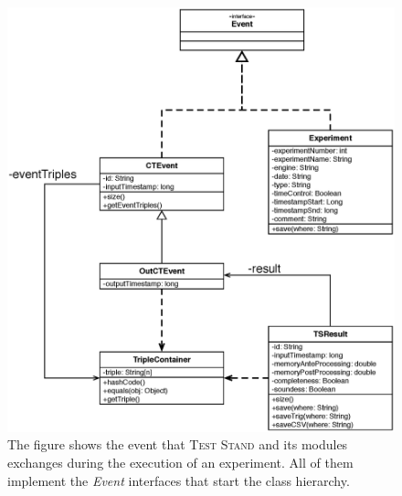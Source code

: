 \begin{figure}[tbh]
  \centering
	\includegraphics[width=\linewidth]{images/uml_events}
	\caption[\name Execution Events - UML Schema]{The figure shows the event that \name \textsc{Test Stand} and its modules 	exchanges during the execution of an experiment. All of them implement the \textit{Event} interfaces that start the class 	hierarchy.} 
	\label{fig:uml_events}
\end{figure}

